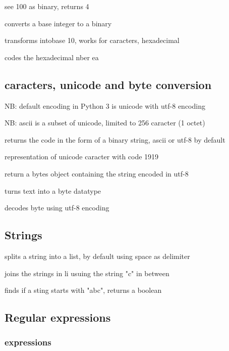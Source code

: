 		  see 100 as binary, returns 4

		 converts a base integer to a binary

		 transforms intobase 10, works for caracters, hexadecimal

		 codes the hexadecimal nber ea


	\subsection{caracters, unicode and byte conversion}

		NB: default encoding in Python 3 is unicode with utf-8 encoding

		NB: ascii is a subset of unicode, limited to 256 caracter (1 octet)

		 returns the code in the form of a binary string, ascii or utf-8 by default

		 representation of unicode caracter with code 1919

		 return a bytes object containing the string encoded in utf-8

		 turns text into a byte datatype

		 decodes byte using utf-8 encoding
	
	\subsection{Strings}

		 splits a string into a list, by default using space as delimiter

		 joins the strings in li usuing the string "c" in between

		 finds if a sting starts with "abc", returns a boolean


	\subsection{Regular expressions}

		\subsubsection{expressions}



